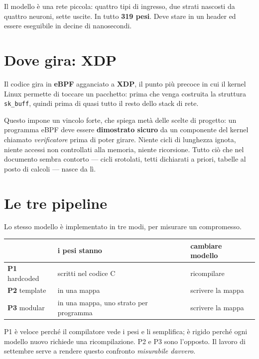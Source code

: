 \documentclass[11pt,a4paper,oneside]{report}
\begin{document}
Il modello è una rete piccola: quattro tipi di ingresso, due strati nascosti da
quattro neuroni, sette uscite. In tutto \textbf{319 pesi}. Deve stare in un
header ed essere eseguibile in decine di nanosecondi.

\section{Dove gira: XDP}

Il codice gira in \textbf{eBPF} agganciato a \textbf{XDP}, il punto più
precoce in cui il kernel Linux permette di toccare un pacchetto: prima che
venga costruita la struttura \texttt{sk\_buff}, quindi prima di quasi tutto il
resto dello stack di rete.

Questo impone un vincolo forte, che spiega metà delle scelte di progetto: un
programma eBPF deve essere \textbf{dimostrato sicuro} da un componente del
kernel chiamato \emph{verificatore} prima di poter girare. Niente cicli di
lunghezza ignota, niente accessi non controllati alla memoria, niente
ricorsione. Tutto ciò che nel documento sembra contorto — cicli srotolati,
tetti dichiarati a priori, tabelle al posto di calcoli — nasce da lì.

\section{Le tre pipeline}

Lo stesso modello è implementato in tre modi, per misurare un compromesso.

\begin{center}
\small
\begin{tabular}{@{}lll@{}}
\toprule
& \textbf{i pesi stanno} & \textbf{cambiare modello} \\
\midrule
\textbf{P1} hardcoded & scritti nel codice C & ricompilare \\
\textbf{P2} template  & in una mappa         & scrivere la mappa \\
\textbf{P3} modular   & in una mappa, uno strato per programma & scrivere la mappa \\
\bottomrule
\end{tabular}
\end{center}

P1 è veloce perché il compilatore vede i pesi e li semplifica; è rigido perché
ogni modello nuovo richiede una ricompilazione. P2 e P3 sono l'opposto. Il
lavoro di settembre serve a rendere questo confronto \emph{misurabile davvero}.
\end{document}
